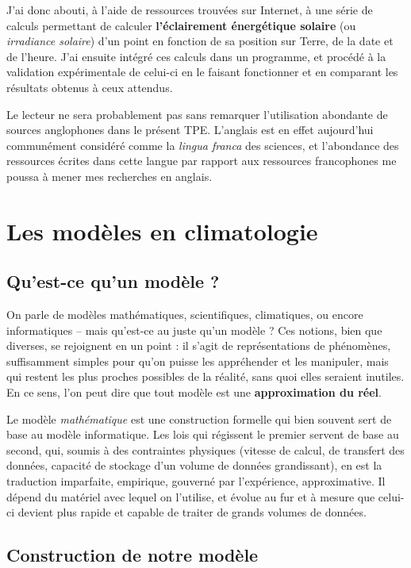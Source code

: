 \documentclass[12pt]{article}
\begin{document}
J'ai donc abouti, à l'aide de ressources trouvées sur Internet, à une série de calculs permettant de calculer \textbf{l'éclairement énergétique solaire} (ou \emph{irradiance solaire}) d'un point en fonction de sa position sur Terre, de la date et de l'heure.
J'ai ensuite intégré ces calculs dans un programme, et procédé à la validation expérimentale de celui-ci en le faisant fonctionner et en comparant les résultats obtenus à ceux attendus.

Le lecteur ne sera probablement pas sans remarquer l'utilisation abondante de sources anglophones dans le présent TPE. L'anglais est en effet aujourd'hui communément considéré comme la \textit{lingua franca} \cite{english_lingua_franca} des sciences, et l'abondance des ressources écrites dans cette langue par rapport aux ressources francophones me poussa à mener mes recherches en anglais. 

\clearpage
\section{Les modèles en climatologie} %

\subsection{Qu'est-ce qu'un modèle ?}

On parle de modèles mathématiques, scientifiques, climatiques, ou encore informatiques -- mais qu'est-ce au juste qu'un modèle ?
Ces notions, bien que diverses, se rejoignent en un point : il s'agit de représentations de phénomènes, suffisamment simples pour qu'on puisse les appréhender et les manipuler, mais qui restent les plus proches possibles de la réalité, sans quoi elles seraient inutiles.
En ce sens, l'on peut dire que tout modèle est une \textbf{approximation du réel}.

Le modèle \emph{mathématique} est une construction formelle qui bien souvent sert de base au modèle informatique. Les lois qui régissent le premier servent de base au second, qui, soumis à des contraintes physiques (vitesse de calcul, de transfert des données, capacité de stockage d'un volume de données grandissant), en est la traduction imparfaite, empirique, gouverné par l'expérience, approximative. Il dépend du matériel avec lequel on l'utilise, et évolue au fur et à mesure que celui-ci devient plus rapide et capable de traiter de grands volumes de données.

\subsection{Construction de notre modèle}
\end{document}
